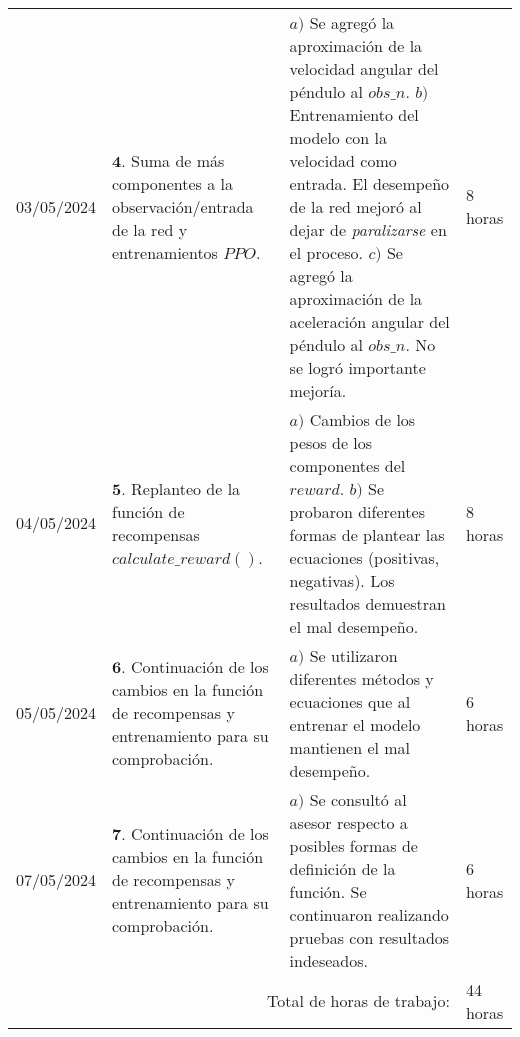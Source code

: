\documentclass[12pt]{article}
\begin{document}
\hfill\\
\begin{minipage}[h]{\textwidth}
	\centering
	\begin{tabularx}{\textwidth}{|p{2cm}|X|X|p{2cm}|} 
		\hline		
		
	 	03/05/2024 & 
	 	$\mathbf{4}.$ Suma de más componentes a la observación/entrada de la red y entrenamientos $PPO$. &
	 	$a)$ Se agregó la aproximación de la velocidad angular del péndulo al $obs\_n$. \newline
	 	$b)$ Entrenamiento del modelo con la velocidad como entrada. El desempeño de la red mejoró al dejar de \textit{paralizarse} en el proceso. \newline
	 	$c)$ Se agregó la aproximación de la aceleración angular del péndulo al $obs\_n$. No se logró importante mejoría. \newline & 
	 	8 horas \\
	 	04/05/2024 & 
	 	$\mathbf{5}.$ Replanteo de la función de recompensas $calculate\_reward()$. &
	 	$a)$ Cambios de los pesos de los componentes del $reward$. \newline
	 	$b)$ Se probaron diferentes formas de plantear las ecuaciones (positivas, negativas). Los resultados demuestran el mal desempeño.  \newline & 
	 	8 horas \\
	 	05/05/2024 & 
	 	$\mathbf{6}.$ Continuación de los cambios en la función de recompensas y entrenamiento para su comprobación. &
	 	$a)$ Se utilizaron diferentes métodos y ecuaciones que al entrenar el modelo mantienen el mal desempeño. \newline & 
	 	6 horas \\
	 	07/05/2024 & 
	 	$\mathbf{7}.$ Continuación de los cambios en la función de recompensas y entrenamiento para su comprobación. &
	 	$a)$ Se consultó al asesor respecto a posibles formas de definición de la función. Se continuaron realizando pruebas con resultados indeseados. \newline & 
	 	6 horas \\
	 	
	 	\hline
		\multicolumn{3}{|r|}{Total de horas de trabajo:} & 44 horas \\ 
	 	\hline                 
	\end{tabularx}
\end{minipage}
\end{document}
